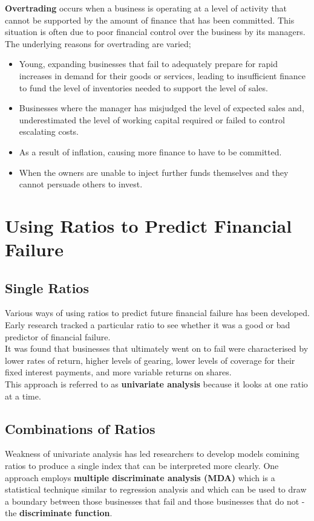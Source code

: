 \documentclass{report}
\begin{document}
\textbf{Overtrading} occurs when a business is operating at a level of activity that cannot be supported by the amount of finance that has been committed. This situation is often due to poor financial control over the business by its managers. The underlying reasons for overtrading are varied;
\begin{itemize}
    \item Young, expanding businesses that fail to adequately prepare for rapid increases in demand for their goods or services, leading to insufficient finance to fund the level of inventories needed to support the level of sales.
    \item Businesses where the manager has misjudged the level of expected sales and, underestimated the level of working capital required or failed to control escalating costs.
    \item As a result of inflation, causing more finance to have to be committed.
    \item When the owners are unable to inject further funds themselves and they cannot persuade others to invest.
\end{itemize}

\section{Using Ratios to Predict Financial Failure}

\subsection{Single Ratios}
Various ways of using ratios to predict future financial failure has been developed. Early research tracked a particular ratio to see whether it was a good or bad predictor of financial failure.\\

It was found that businesses that ultimately went on to fail were characterised by lower rates of return, higher levels of gearing, lower levels of coverage for their fixed interest payments, and more variable returns on shares.\\

This approach is referred to as \textbf{univariate analysis} because it looks at one ratio at a time.

\subsection{Combinations of Ratios}
Weakness of univariate analysis has led researchers to develop models comining ratios to produce a single index that can be interpreted more clearly. One approach employs \textbf{multiple discriminate analysis (MDA)} which is a statistical technique similar to regression analysis and which can be used to draw a boundary between those businesses that fail and those businesses that do not - the \textbf{discriminate function}.
\end{document}
